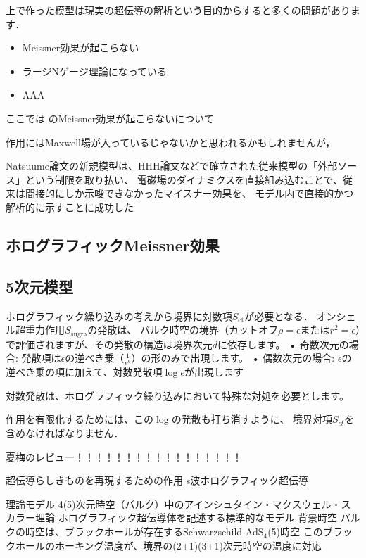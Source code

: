 \documentclass[b5paper,11pt,dvipdfmx]{jsarticle}
\numberwithin{equation}{section}
\theoremstyle{definition}
\begin{document}
上で作った模型は現実の超伝導の解析という目的からすると多くの問題があります．
\begin{itemize}
    \item Meissner効果が起こらない
    \item ラージNゲージ理論になっている
    \item AAA
\end{itemize}
ここでは
のMeissner効果が起こらないについて

作用にはMaxwell場が入っているじゃないかと思われるかもしれませんが，

Natsuume論文の新規模型は、HHH論文などで確立された従来模型の「外部ソース」という制限を取り払い、
電磁場のダイナミクスを直接組み込むことで、従来は間接的にしか示唆できなかったマイスナー効果を、
モデル内で直接的かつ解析的に示すことに成功した

\subsection{ホログラフィックMeissner効果}




\subsection{5次元模型}

ホログラフィック繰り込みの考えから境界に対数項$S_{\text{ct}}$が必要となる．
オンシェル超重力作用$S_{\text{sugra}}$の発散は、
バルク時空の境界（カットオフ$\rho = \epsilon$または$r^2 = \epsilon$）で評価されますが、その発散の構造は境界次元$d$に依存します。
• 奇数次元の場合: 発散項は$\epsilon$の逆べき乗（$\frac{1}{\epsilon^k}$）の形のみで出現します。
• 偶数次元の場合: $\epsilon$の逆べき乗の項に加えて、対数発散項$\log \epsilon$が出現します


対数発散は、ホログラフィック繰り込みにおいて特殊な対処を必要とします。

作用を有限化するためには、この$\log$の発散も打ち消すように、
境界対項$S_{ct}$を含めなければなりません\cite{deHaro00}．






夏梅のレビュー！！！！！！！！！！！！！！！！！

超伝導らしきものを再現するための作用
s波ホログラフィック超伝導

理論モデル
4(5)次元時空（バルク）中のアインシュタイン・マクスウェル・スカラー理論
ホログラフィック超伝導体を記述する標準的なモデル
背景時空
バルクの時空は、ブラックホールが存在するSchwarzschild-AdS$_4$(5)時空
このブラックホールのホーキング温度が、境界の(2+1)(3+1)次元時空の温度に対応
\end{document}
